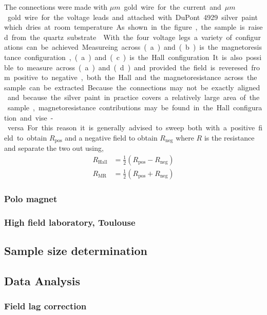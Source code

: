 The connections were made with \unit[20]{$\mu m$} gold wire for the current and \unit[10]{$\mu m$} gold wire for the voltage leads and attached with DuPont 4929 silver paint which dries at room temperature. As shown in the figure, the sample is raised from the quartz substrate .

With the four voltage legs a variety of configurations can be achieved. Measureing across (a) and (b) is the magnetoresistance configuration, (a) and (c) is the Hall configuration. It is also possible to measure across (a) and (d) and provided the field is reveresed from positive to negative, both the Hall and the magnetoresistance across the sample can be extracted.

Because the connections may not be exactly aligned and because the silver paint in practice covers a relatively large area of the sample, magnetoresistance contributions may be found in the Hall configuration and vise-versa. For this reason it is generally advised to sweep both with a positive field to obtain $R_{\textrm{pos}}$ and a negative field to obtain $R_{\textrm{neg}}$ where $R$ is the resistance and separate the two out using,
\begin{align}
R_{\textrm{Hall}} &= \frac{1}{2}( R_{\textrm{pos}} - R_{\textrm{neg}} ) \\
R_{\textrm{MR}} &= \frac{1}{2}( R_{\textrm{pos}} + R_{\textrm{neg}} )
\end{align}



\subsubsection{Polo magnet}

\subsubsection{High field laboratory, Toulouse}

\subsection{Sample size determination}

\subsection{Data Analysis}

\subsubsection{Field lag correction}


